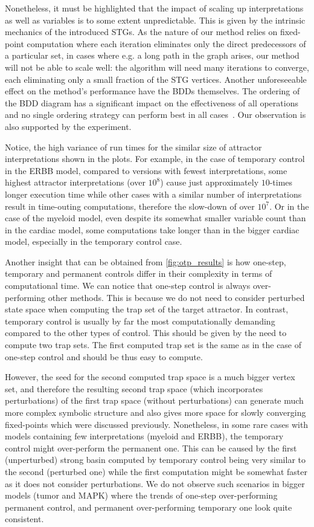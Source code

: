 Nonetheless, it must be highlighted that the impact of scaling up interpretations as well as variables is to some extent unpredictable. This is given by the intrinsic mechanics of the introduced STGs. As the nature of our method relies on fixed-point computation where each iteration eliminates only the direct predecessors of a particular set, in cases where e.g. a long path in the graph arises, our method will not be able to scale well: the algorithm will need many iterations to converge, each eliminating only a small fraction of the STG vertices. Another unforeseeable effect on the method's performance have the BDDs themselves. The ordering of the BDD diagram has a significant impact on the effectiveness of all operations and no single ordering strategy can perform best in all cases~\cite{Harlow2001}. Our observation is also supported by the experiment. 

Notice, the high variance of run times for the similar size of attractor interpretations shown in the plots. For example, in the case of temporary control in the ERBB model, compared to versions with fewest interpretations, some highest attractor interpretations (over $10^8$) cause just approximately $10$-times longer execution time while other cases with a similar number of interpretations result in time-outing computations, therefore the slow-down of over $10^7$. Or in the case of the myeloid model, even despite its somewhat smaller variable count than in the cardiac model, some computations take longer than in the bigger cardiac model, especially in the temporary control case. 

Another insight that can be obtained from \autoref{fig:otp_results} is how one-step, temporary and permanent controls differ in their complexity in terms of computational time. We can notice that one-step control is always over-performing other methods. This is because we do not need to consider perturbed state space when computing the trap set of the target attractor. In contrast, temporary control is usually by far the most computationally demanding compared to the other types of control. This should be given by the need to compute two trap sets. The first computed trap set is the same as in the case of one-step control and should be thus easy to compute. 

However, the seed for the second computed trap space is a much bigger vertex set, and therefore the resulting second trap space (which incorporates perturbations) of the first trap space (without perturbations) can generate much more complex symbolic structure and also gives more space for slowly converging fixed-points which were discussed previously. Nonetheless, in some rare cases with models containing few interpretations (myeloid and ERBB), the temporary control might over-perform the permanent one. This can be caused by the first (unperturbed) strong basin computed by temporary control being very similar to the second (perturbed one) while the first computation might be somewhat faster as it does not consider perturbations. We do not observe such scenarios in bigger models (tumor and MAPK) where the trends of one-step over-performing permanent control, and permanent over-performing temporary one look quite consistent.

